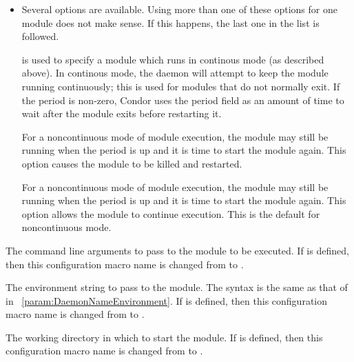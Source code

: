 \begin{description}
\begin{itemize}
   \item Several options are available. Using more than one
   of these options for one module does not make sense.  If this happens,
   the last one in the list is followed.

	 is used to specify a module which runs in continous
	mode (as described above).
	In continous mode, the  daemon will
	attempt to keep the module running continuously;
	this is used for modules that do not normally exit.
	If the period is non-zero, Condor uses the period field as
	an amount of time to wait after
	the module exits before restarting it.

	For a noncontinuous mode of module execution,
	the module may still be running when the period is up
	and it is time to start the module again.
	This option causes the module to be killed and restarted.

	For a noncontinuous mode of module execution,
	the module may still be running when the period is up
	and it is time to start the module again.
	This option allows the module to continue execution.
	This is the default for noncontinuous mode.
	
  \end{itemize}


\item[\Macro{STARTD\_CRON\_modulename\_ARGS}]
\label{param:StartdCronModuleArgs}
  The command line arguments to pass to the module to be executed. 
  If 
  is defined, then this configuration macro name is changed from
   to
  .


\item[\Macro{STARTD\_CRON\_modulename\_ENV}]
\label{param:StartdCronModuleEnv}
  The environment string to pass to the module.
  The syntax is the same as that of 
   in ~\ref{param:DaemonNameEnvironment}.
  If 
  is defined, then this configuration macro name is changed from
   to
  .

\item[\Macro{STARTD\_CRON\_modulename\_CWD}]
\label{param:StartdCronModuleCwd}
  The working directory in which to start the module.
  If 
  is defined, then this configuration macro name is changed from
   to
  .


\end{description}

